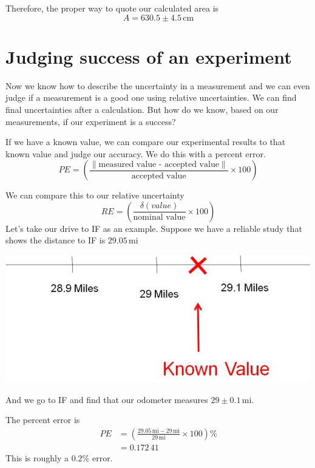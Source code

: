 \documentclass[twoside,11pt,ShortChapTitles]{BYUTextbook}
\begin{document}
Therefore, the proper way to quote our calculated area is
\[ A = 630.5 \pm 4.5\,\text{cm}\]

\section{Judging success of an experiment}

Now we know how to describe the uncertainty in a measurement and we can even
judge if a measurement is a good one using relative uncertainties. We can find
final uncertainties after a calculation. But how do we know, based on our
measurements, if our experiment is a success?

If we have a known value, we can compare our experimental results to that
known value and judge our accuracy. We do this with a percent error.
\[
PE=\left(  \frac{\left\|\text{measured value - accepted value}\right\|}{\text{accepted
value}}\times100\right)  \]




We can compare this to our relative uncertainty\[
RE=\left(  \frac{\delta(value)}{\text{nominal value}}\times100\right)  \]
Let's take our drive to IF as an example. Suppose we have a reliable study
that shows the distance to IF is $29.05\,\text{mi} $

\begin{center}
\includegraphics[width=\textwidth]{Lab1_Figs/old_images-008.png}\end{center}
 \bigskip And we go to IF and find that our odometer measures $29\pm0.1\,\text{mi} .$

The percent error is
\begin{align*}
PE  & =\left(  \frac{29.05\,\text{mi} -29\,\text{mi} }{29\,\text{mi} }\times100\right)  \%\\
& =0.172\,41\
\end{align*}
This is roughly a $0.2\%$ error.
\end{document}
